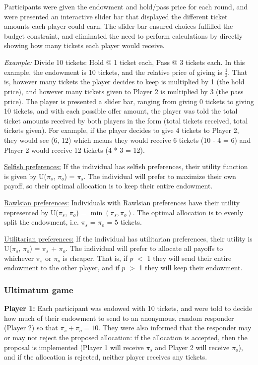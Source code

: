 \documentclass[12pt]{article}
\begin{document}
Participants were given the endowment and hold/pass price for each round, and were presented an interactive slider bar that displayed the different ticket amounts each player could earn. The slider bar ensured choices fulfilled the budget constraint, and eliminated the need to perform calculations by directly showing how many tickets each player would receive.

\textit{Example:} Divide 10 tickets: Hold @ 1 ticket each, Pass @ 3 tickets each. In this example, the endowment is 10 tickets, and the relative price of giving is \(\frac{1}{3}\). That is, however many tickets the player decides to keep is multiplied by 1 (the hold price), and however many tickets given to Player 2 is multiplied by 3 (the pass price). The player is presented a slider bar, ranging from giving 0 tickets to giving 10 tickets, and with each possible offer amount, the player was told the total ticket amounts received by both players in the form (total tickets received, total tickets given). For example, if the player decides to give 4 tickets to Player 2, they would see (6, 12) which means they would receive 6 tickets (10 - 4 = 6) and Player 2 would receive 12 tickets (4 * 3 = 12).

\underline{Selfish preferences:} If the individual has selfish preferences, their utility function is given by U(\(\pi_{s}\), \(\pi_{o}\)) = \(\pi_{s}\). The individual will prefer to maximize their own payoff, so their optimal allocation is to keep their entire endowment.

\underline{Rawlsian preferences:} Individuals with Rawlsian preferences have their utility represented by U(\(\pi_{s}\), \(\pi_{o}\)) = \(\min(\pi_{s}, \pi_{o})\). The optimal allocation is to evenly split the endowment, i.e. \(\pi_{s}\) = \(\pi_{o}\) = 5 tickets.

\underline{Utilitarian preferences:} If the individual has utilitarian preferences, their utility is U(\(\pi_{s}\), \(\pi_{o}\)) = \(\pi_{s}\) + \(\pi_{o}\). The individual will prefer to allocate all payoffs to whichever \(\pi_{s}\) or \(\pi_{o}\) is cheaper. That is, if \(p\) $<$ 1 they will send their entire endowment to the other player, and if \(p\) $>$ 1 they will keep their endowment.



\subsubsection{Ultimatum game}

\textbf{Player 1:} Each participant was endowed with 10 tickets, and were told to decide how much of their endowment to send to an anonymous, random responder (Player 2) so that \(\pi_{s} + \pi_{o} = 10\). They were also informed that the responder may or may not reject the proposed allocation: if the allocation is accepted, then the proposal is implemented (Player 1 will receive \(\pi_{s}\) and Player 2 will receive \(\pi_{o}\)), and if the allocation is rejected, neither player receives any tickets.
\end{document}
